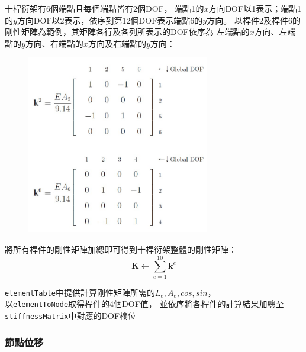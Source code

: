 \documentclass[12pt,a4paper]{article}
\begin{document}
            十桿衍架有6個端點且每個端點皆有2個DOF，
            端點1的$x$方向DOF以1表示；端點1的$y$方向DOF以2表示，依序到第12個DOF表示端點6的$y$方向。
            以桿件2及桿件6的剛性矩陣為範例，其矩陣各行及各列所表示的DOF依序為
            左端點的$x$方向、左端點的$y$方向、右端點的$x$方向及右端點的$y$方向：
            \begin{figure}[h]
                \centering
                \includegraphics[width=8cm]{Stiffness_matrix_GlobalDOF}
            \end{figure}

            將所有桿件的剛性矩陣加總即可得到十桿衍架整體的剛性矩陣：
            \begin{displaymath}
                \mathbf{K} \leftarrow \sum_{e=1}^{10} \mathbf{k}^e
            \end{displaymath}

            \texttt{elementTable}中提供計算剛性矩陣所需的$L_e,A_e,cos,sin$，\\
            以\texttt{elementToNode}取得桿件的4個DOF值，
            並依序將各桿件的計算結果加總至\texttt{stiffnessMatrix}中對應的DOF欄位
            
        
        \newpage
        \subsubsection{節點位移}
\end{document}

